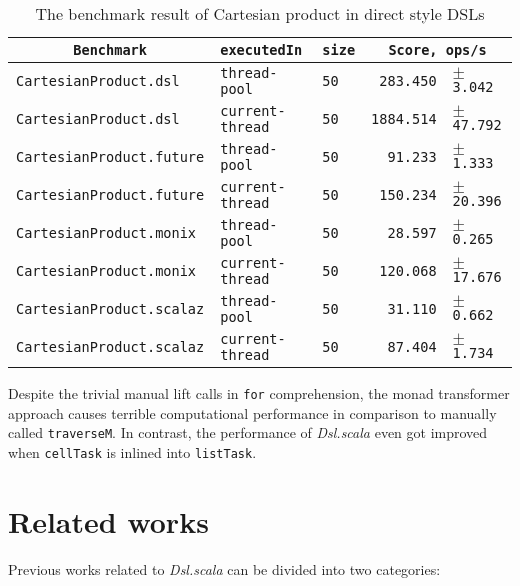 \begin{table}[htbp]
  \begin{tabular}{l|l|l|rl}
   \multicolumn{1}{c|}{\texttt{Benchmark}} & \texttt{executedIn} & \texttt{size} & \multicolumn{2}{c}{\texttt{Score, ops/s}} \\
  \hline
  \texttt{CartesianProduct.dsl} & \texttt{thread-pool} & \texttt{50} & \texttt{283.450} & \scriptsize $\pm$ \texttt{3.042}  \\
  \texttt{CartesianProduct.dsl} & \texttt{current-thread} & \texttt{50} & \texttt{1884.514} & \scriptsize $\pm$ \texttt{47.792}  \\
  \texttt{CartesianProduct.future} & \texttt{thread-pool} & \texttt{50} & \texttt{91.233} & \scriptsize $\pm$ \texttt{1.333}  \\
  \texttt{CartesianProduct.future} & \texttt{current-thread} & \texttt{50} & \texttt{150.234} & \scriptsize $\pm$ \texttt{20.396}  \\
  \texttt{CartesianProduct.monix} & \texttt{thread-pool} & \texttt{50} & \texttt{28.597} & \scriptsize $\pm$ \texttt{0.265}  \\
  \texttt{CartesianProduct.monix} & \texttt{current-thread} & \texttt{50} & \texttt{120.068} & \scriptsize $\pm$ \texttt{17.676}  \\
  \texttt{CartesianProduct.scalaz} & \texttt{thread-pool} & \texttt{50} & \texttt{31.110} & \scriptsize $\pm$ \texttt{0.662}  \\
  \texttt{CartesianProduct.scalaz} & \texttt{current-thread} & \texttt{50} & \texttt{87.404} & \scriptsize $\pm$ \texttt{1.734}  \\
  \end{tabular}
  \caption{The benchmark result of Cartesian product in direct style DSLs}
  \label{CartesianProduct}
\end{table}

Despite the trivial manual lift calls in \lstinline{for} comprehension, the monad transformer approach causes terrible computational performance in comparison to manually called \lstinline{traverseM}. In contrast, the performance of \textit{Dsl.scala} even got improved when \lstinline{cellTask} is inlined into \lstinline{listTask}.


\section{Related works}

Previous works related to \textit{Dsl.scala} can be divided into two categories:%

